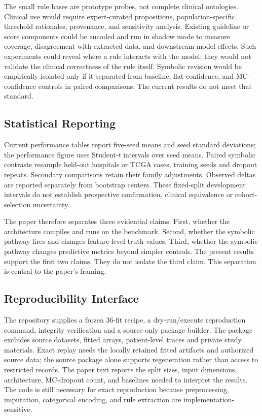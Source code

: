 \documentclass{article}
\begin{document}

The small rule bases are prototype probes, not complete clinical ontologies. Clinical use would require expert-curated propositions, population-specific threshold rationales, provenance, and sensitivity analysis. Existing guideline or score components could be encoded and run in shadow mode to measure coverage, disagreement with extracted data, and downstream model effects. Such experiments could reveal where a rule interacts with the model; they would not validate the clinical correctness of the rule itself. Symbolic revision would be empirically isolated only if it separated from baseline, flat-confidence, and MC-confidence controls in paired comparisons. The current results do not meet that standard.

\subsection{Statistical Reporting}

Current performance tables report five-seed means and seed standard deviations; the performance figure uses Student-$t$ intervals over seed means. Paired symbolic contrasts resample held-out hospitals or TCGA cases, training seeds and dropout repeats. Secondary comparisons retain their family adjustments. Observed deltas are reported separately from bootstrap centers. These fixed-split development intervals do not establish prospective confirmation, clinical equivalence or cohort-selection uncertainty.

The paper therefore separates three evidential claims. First, whether the architecture compiles and runs on the benchmark. Second, whether the symbolic pathway fires and changes feature-level truth values. Third, whether the symbolic pathway changes predictive metrics beyond simpler controls. The present results support the first two claims. They do not isolate the third claim. This separation is central to the paper's framing.

\subsection{Reproducibility Interface}

The repository supplies a frozen 36-fit recipe, a dry-run/execute reproduction command, integrity verification and a source-only package builder. The package excludes source datasets, fitted arrays, patient-level traces and private study materials. Exact replay needs the locally retained fitted artifacts and authorized source data; the source package alone supports regeneration rather than access to restricted records. The paper text reports the split sizes, input dimensions, architecture, MC-dropout count, and baselines needed to interpret the results. The code is still necessary for exact reproduction because preprocessing, imputation, categorical encoding, and rule extraction are implementation-sensitive.
\end{document}
